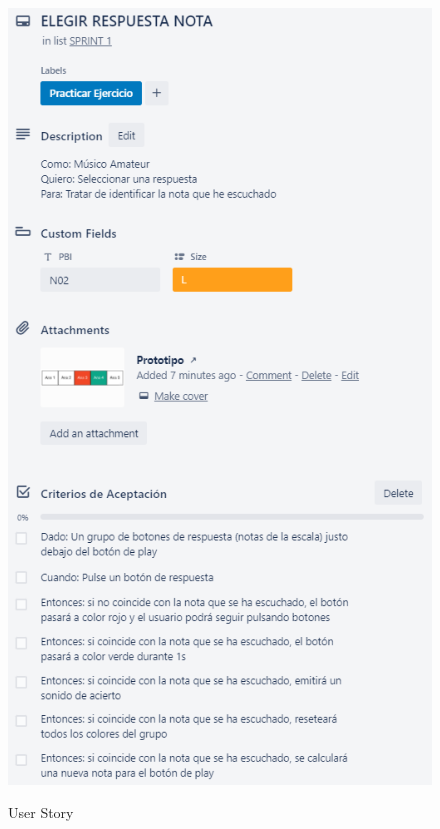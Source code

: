 \documentclass[12pt,twoside,titlepage]{report}
\begin{document}
\begin{figure}[H]
    \centering
    \includegraphics[scale=1.3]{Scrum/User Stories/NotasRespuestas}
    \label{fig:NotasRespuestas}
    \caption{User Story}
\end{figure}
\end{document}
